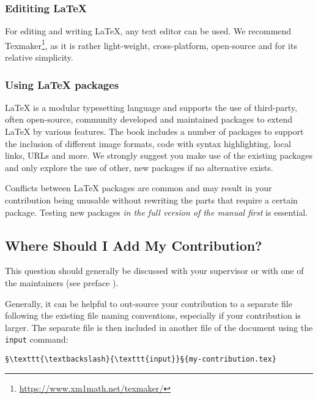 \subsubsection{Edititing \LaTeX{}}


For editing and writing \LaTeX{}, any text editor can be used.
We recommend Texmaker\footnote{\url{https://www.xm1math.net/texmaker/}}, as it is rather light-weight, cross-platform, open-source and for its relative simplicity.
\bigskip

\subsubsection{Using \LaTeX{} packages}


\LaTeX{} is a modular typesetting language and supports the use of third-party, often open-source, community developed and maintained packages to extend \LaTeX{} by various features.
The \asterics book includes a number of packages to support the inclusion of different image formats, code with syntax highlighting, local links, URLs and more.
We strongly suggest you make use of the existing packages and only explore the use of other, new packages if no alternative exists.


Conflicts between \LaTeX{} packages are common and may result in your contribution being unusable without rewriting the parts that require a certain package.
Testing new packages \emph{in the full version of the manual first} is essential.


\subsection{Where Should I Add My Contribution?}

This question should generally be discussed with your supervisor or with one of the maintainers (see preface ).

Generally, it can be helpful to out-source your contribution to a separate file following the existing file naming conventions, especially if your contribution is larger.
The separate file is then included in another file of the document using the \texttt{input} command:
\begin{lstlisting}[style=LaTeXStyle]
§\texttt{\textbackslash}{\texttt{input}}§{my-contribution.tex}
\end{lstlisting}


